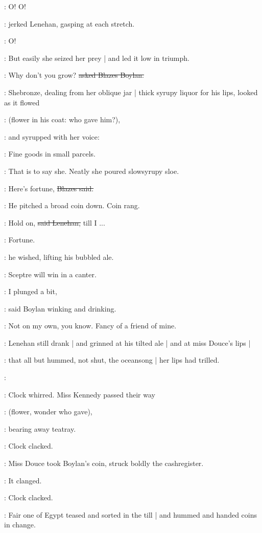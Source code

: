 \lenehan:
O!
O!

:
jerked Lenehan,
gasping at each stretch.

\lenehan:
O!

:
But easily she seized her prey |
and led it low in triumph.

\boylan:
Why don't you grow?
\sout{asked Blazes Boylan.}

:
Shebronze,
dealing from her oblique jar |
thick syrupy liquor for his lips,
looked as it flowed

\BloomInt:
(flower in his coat:
who gave him?),

:
and syrupped with her voice:

\MissD:
Fine goods in small parcels.

:
That is to say she.
Neatly she poured slowsyrupy sloe.

\boylan:
Here's fortune,
\sout{Blazes said.}

:
He pitched a broad coin down.
Coin rang.

\lenehan:
Hold on,
\sout{said Lenehan,}
till I ...

\lenehan:
Fortune.

:
he wished,
lifting his bubbled ale.

\lenehan:
Sceptre will win in a canter.

\boylan:
I plunged a bit,

:
said Boylan winking and drinking.

\boylan:
Not on my own,
you know.
Fancy of a friend of mine.

:
Lenehan still drank |
and grinned at his tilted ale |
and at miss Douce's lips |

:
that all but hummed,
not shut,
the oceansong |
her lips had trilled.

\MissD:

:
Clock whirred.
Miss Kennedy passed their way

\BloomInt:
(flower,
wonder who gave),

:
bearing away teatray.

:
Clock clacked.

:
Miss Douce took Boylan's coin,
struck boldly the cashregister.

:
It clanged.

:
Clock clacked.

:
Fair one of Egypt teased and sorted in the till |
and hummed and handed coins in change.

